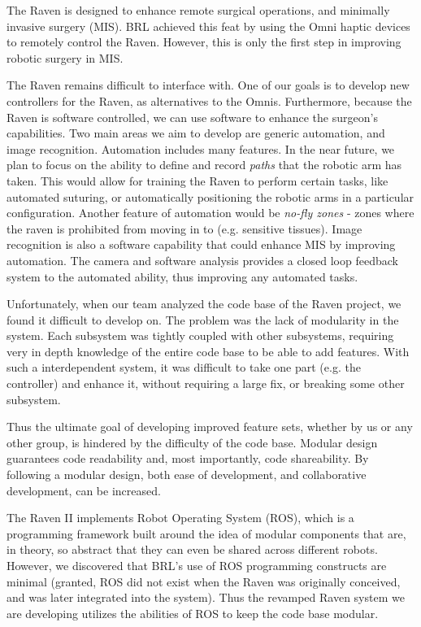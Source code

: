\documentclass[letterpaper,twocolumn,10pt]{article}
\begin{document}
The Raven is designed to enhance remote surgical operations, and 
minimally invasive surgery (MIS). BRL achieved this feat by using the 
Omni haptic devices to remotely control the Raven. However, this is 
only the first step in improving robotic surgery in MIS.

The Raven remains difficult to interface with. One of our goals is to 
develop new controllers for the Raven, as alternatives to the Omnis. 
Furthermore, because the Raven is software controlled, we can use 
software to enhance the surgeon's capabilities. Two main areas we 
aim to develop are generic automation, and image recognition. 
Automation includes many features. In the near future, we plan to 
focus on the ability to define and record \emph{paths} that the 
robotic arm has taken. This would allow for training the Raven to 
perform certain tasks, like automated suturing, or automatically 
positioning the robotic arms in a particular configuration. Another 
feature of automation would be \emph{no-fly zones} - zones where 
the raven is prohibited from moving in to (e.g. sensitive tissues). 
Image recognition is also a software capability that could enhance 
MIS by improving automation. The camera and software analysis provides 
a closed loop feedback system to the automated ability, thus improving 
any automated tasks.

Unfortunately, when our team analyzed the code base of the Raven 
project, we found it difficult to develop on. The problem was the lack 
of modularity in the system. Each subsystem was tightly coupled with 
other subsystems, requiring very in depth knowledge of the entire 
code base to be able to add features. With such a interdependent 
system, it was difficult to take one part (e.g. the controller) and 
enhance it, without requiring a large fix, or breaking some other 
subsystem.

Thus the ultimate goal of developing improved feature sets, whether 
by us or any other group, is hindered by the difficulty of the code 
base. Modular design guarantees code readability
and, most importantly, code shareability. By following a modular 
design, both ease of development, and collaborative development, can 
be increased.

The Raven II implements
Robot Operating System (ROS), which is a programming framework built
around the idea of modular components that are, in theory, so abstract
that they can even be shared across different robots. However, we
discovered that BRL's use of ROS programming constructs are minimal
(granted, ROS did not exist when the Raven was originally conceived,
and was later integrated into the system). Thus the revamped Raven 
system we are developing utilizes the abilities of ROS to keep the 
code base modular.
\end{document}
